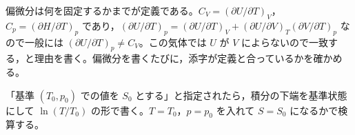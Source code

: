 \item {} 偏微分は何を固定するかまでが定義である。$C_{V}=(\partial U/\partial T)_{V}$，$C_{p}=(\partial H/\partial T)_{p}$ であり，$(\partial U/\partial T)_{p}=(\partial U/\partial T)_{V}+(\partial U/\partial V)_{T}(\partial V/\partial T)_{p}$ なので一般には $(\partial U/\partial T)_{p}\neq C_{V}$。この気体では $U$ が $V$ によらないので一致する，と理由を書く。偏微分を書くたびに，添字が定義と合っているかを確かめる。
\item 「基準 $(T_{0},p_{0})$ での値を $S_{0}$ とする」と指定されたら，積分の下端を基準状態にして $\ln(T/T_{0})$ の形で書く。$T=T_{0}$，$p=p_{0}$ を入れて $S=S_{0}$ になるかで検算する。
